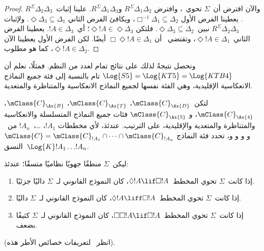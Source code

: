 \documentclass[../../../include/open-logic-section]{subfiles}
\begin{document}
\begin{proof}
  والآن افترض أن~$\Sigma$ تحوي~، وافترض
  $R^\Sigma \Delta_1\Delta_2$ و$R^\Sigma \Delta_1\Delta_3$.
  علينا إثبات~$R^\Sigma \Delta_2\Delta_3$. يعطينا الفرض الأول
  $\Box^{-1}\Delta_1 \subseteq \Delta_2$، ويكافئ الفرض الثاني
  $\Diamond\Delta_3 \subseteq \Delta_1$. ولإثبات
  $R^\Sigma \Delta_2\Delta_3$
  نبين~$\Diamond\Delta_3 \subseteq \Delta_2$. فلتكن
  $\Diamond!A \in \Diamond\Delta_3$؛ أي~$!A \in \Delta_3$. يعطينا
  الفرض الثاني~$\Diamond!A \in \Delta_1$، وتقتضي~ أن
  $\Box\Diamond!A \in \Delta_1$ أيضًا. لكن الفرض الأول يعطينا الآن
  $\Diamond!A \in \Delta_2$، كما هو مطلوب.
\end{proof}

ونحصل نتيجةً لذلك على نتائج تمام لعدد من النظم. فمثلًا، نعلم أن
$\Log{S5} = \Log{KT5} = \Log{KTB4}$ تام بالنسبة إلى فئة جميع النماذج
الانعكاسية الإقليدية، وهي الفئة نفسها لجميع النماذج الانعكاسية
والمتناظرة والمتعدية.

\begin{thm}
  لتكن~$\mClass{C}_\Ax{D}$، $\mClass{C}_\Ax{T}$،
  $\mClass{C}_\Ax{B}$، $\mClass{C}_\Ax{4}$، و
  $\mClass{C}_\Ax{5}$ فئات جميع النماذج المتسلسلة والانعكاسية
  والمتناظرة والمتعدية والإقليدية، على الترتيب. عندئذ، لأي مخططات
  $!A_1$، \dots،~$!A_n$ من~ و و و و،
  تحدد فئة النماذج
  $\mClass{C} = \mClass{C}_{!A_1} \cap \dots
  \cap \mClass{C}_{!A_n}$ النسق~$\Log{K}!A_1 \dots !A_n$.
\end{thm}

\begin{prop}
  ليكن~$\Sigma$ منطقًا جهويًا نظاميًا متسقًا؛ عندئذ:
  \begin{enumerate}
  \item{}%
    إذا كانت~$\Sigma$ تحوي المخطط~$\Diamond!A \lif \Box !A$، كان
    النموذج القانوني لـ~$\Sigma$ داليًا جزئيًا.
  \item إذا كانت~$\Sigma$ تحوي المخطط~$\Diamond!A \liff \Box !A$،
    كان النموذج القانوني لـ~$\Sigma$ داليًا.
  \item إذا كانت~$\Sigma$ تحوي المخطط~$\Box\Box!A \lif \Box !A$،
    كان النموذج القانوني لـ~$\Sigma$ كثيفًا بضعف.
  \end{enumerate}
(انظر~ لتعريفات خصائص الأطر هذه).
\end{prop}
\end{document}
